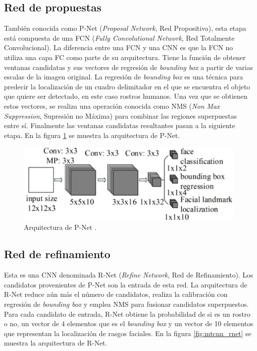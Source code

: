 \subsection{Red de propuestas}
También conocida como P-Net (\textit{Proposal Network}, Red Propositiva), esta etapa está compuesta de una FCN (\textit{Fully Convolutional Network}, Red Totalmente Convolucional). La diferencia entre una FCN y una CNN es que la FCN no utiliza una capa FC como parte de su arquitectura. Tiene la función de obtener ventanas candidatas y sus vectores de regresión de \textit{bounding box} a partir de varias escalas de la imagen original. La regresión de \textit{bounding box} es una técnica para predecir la localización de un cuadro delimitador en el que se encuentra el objeto que quiere ser detectado, en este caso rostros humanos. Una vez que se obtienen estos vectores, se realiza una operación conocida como NMS (\textit{Non Max Suppression}, Supresión no Máxima) para combinar las regiones superpuestas entre sí. Finalmente las ventanas candidatas resultantes pasan a la siguiente etapa. En la figura \ref{fig:mtcnn_pnet} se muestra la arquitectura de P-Net.

\begin{figure}[h]
	\centering
	\includegraphics[scale=0.25]{./Figures/mtcnn_pnet.png}
	\caption{Arquitectura de P-Net \cite{mtcnn_info}.}
	\label{fig:mtcnn_pnet}
\end{figure}
	
\subsection{Red de refinamiento}
Esta es una CNN denominada R-Net (\textit{Refine Network}, Red de Refinamiento). Los candidatos provenientes de P-Net son la entrada de esta red. La arquitectura de R-Net reduce aún más el número de candidatos, realiza la calibración con regresión de \textit{bounding box} y emplea NMS para fusionar candidatos superpuestos. Para cada candidato de entrada, R-Net obtiene la probabilidad de si es un rostro o no, un vector de 4 elementos que es el \textit{bounding box} y un vector de 10 elementos que representan la localización de rasgos faciales. En la figura \ref{fig:mtcnn_rnet} se muestra la arquitectura de R-Net.

